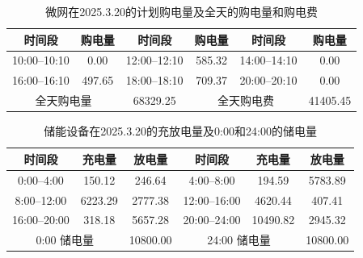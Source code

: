 \documentclass[UTF8]{ctexart}
\begin{document}
    \begin{table}[htbp]
        \centering
        \caption{微网在2025.3.20的计划购电量及全天的购电量和购电费}
        \label{tab:q2_tenminute}
        
        \begin{tabular}{cccccc}
            \toprule
            时间段 & 购电量 & 时间段 & 购电量 & 时间段 & 购电量 \\
            \midrule
            
            10:00--10:10 & 0.00 &
            12:00--12:10 & 585.32 &
            14:00--14:10 & 0.00 \\
            
            16:00--16:10 & 497.65 &
            18:00--18:10 & 709.37 &
            20:00--20:10 & 0.00 \\
            
            \midrule
            \multicolumn{2}{c}{全天购电量} &
            68329.25 &
            \multicolumn{2}{c}{全天购电费} &
            41405.45 \\
            \bottomrule
        \end{tabular}
    \end{table}
    
    \begin{table}[htbp]
        \centering
        \caption{储能设备在2025.3.20的充放电量及0:00和24:00的储电量}
        \label{tab:q2_battery}
        
        \begin{tabular}{cccccc}
            \toprule
            时间段 & 充电量 & 放电量 &
            时间段 & 充电量 & 放电量 \\
            \midrule
            
            0:00--4:00   & 150.12 & 246.64 &
            4:00--8:00   & 194.59 & 5783.89 \\
            
            8:00--12:00  & 6223.29 & 2777.38 &
            12:00--16:00 & 4620.44 & 407.41 \\
            
            16:00--20:00 & 318.18 & 5657.28 &
            20:00--24:00 & 10490.82 & 2945.32 \\
            
            \midrule
            
            \multicolumn{2}{c}{0:00 储电量} &
            10800.00 &
            \multicolumn{2}{c}{24:00 储电量} &
            10800.00 \\
            
            \bottomrule
        \end{tabular}
    \end{table}
    
\end{document}
